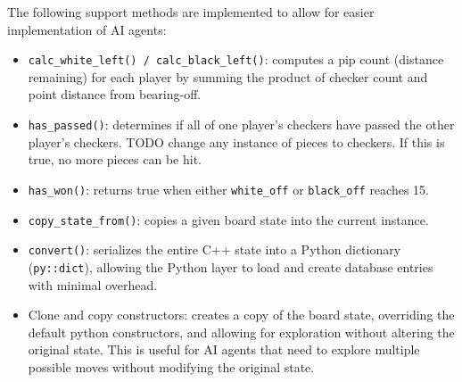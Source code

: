 The following support methods are implemented to allow for easier implementation of AI agents:
\begin{itemize}
    \item \texttt{calc\_white\_left() / calc\_black\_left()}: computes a pip count (distance remaining) for each player by summing the product of checker count and point distance from bearing-off.
    \item \texttt{has\_passed()}: determines if all of one player's checkers have passed the other player's checkers. TODO change any instance of pieces to checkers. If this is true, no more pieces can be hit. 
    \item \texttt{has\_won()}: returns true when either \texttt{white\_off} or \texttt{black\_off} reaches 15.
    \item \texttt{copy\_state\_from()}: copies a given board state into the current instance.
    \item \texttt{convert()}: serializes the entire C++ state into a Python dictionary (\texttt{py::dict}), allowing the Python layer to load and create database entries with minimal overhead.
    \item Clone and copy constructors: creates a copy of the board state, overriding the default python constructors, and allowing for exploration without altering the original state. This is useful for AI agents that need to explore multiple possible moves without modifying the original state.
\end{itemize}

